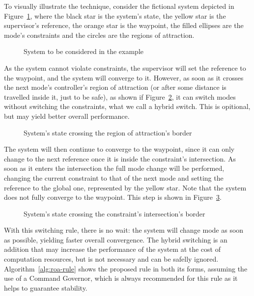 To visually illustrate the technique, consider the fictional system depicted in
Figure~\ref{fig:roa-ex1}, where the black star is the system's state, the yellow
star is the supervisor's reference, the orange star is the waypoint, the filled
ellipses are the mode's constraints and the circles are the regions of
attraction.

\begin{figure}[!htb]
  \centering
  
  \caption{System to be considered in the example}%
  \label{fig:roa-ex1}
\end{figure}

As the system cannot violate constraints, the supervisor will set the reference
to the waypoint, and the system will converge to it. However, as soon as it
crosses the next mode's controller's region of attraction (or after some
distance is travelled inside it, just to be safe), as shown if
Figure~\ref{fig:roa-ex2}, it can switch modes without switching the constraints,
what we call a hybrid switch. This is opitional, but may yield better overall
performance.

\begin{figure}[!htb]
  \centering
  
  \caption{System's state crossing the region of attraction's border}%
  \label{fig:roa-ex2}
\end{figure}

The system will then continue to converge to the waypoint, since it can only
change to the next reference once it is inside the constraint's intersection. As
soon as it enters the intersection the full mode change will be performed,
changing the current constraint to that of the next mode and setting the
reference to the global one, represented by the yellow star. Note that the
system does not fully converge to the waypoint. This step is shown in
Figure~\ref{fig:roa-ex3}.

\begin{figure}[!htb]
  \centering
  
  \caption{System's state crossing the constraint's intersection's border}%
  \label{fig:roa-ex3}
\end{figure}

With this switching rule, there is no wait: the system will change mode as soon
as possible, yielding faster overall convergence. The hybrid switching is an
addition that may increase the performance of the system at the cost of
computation resources, but is not necessary and can be safelly ignored.
Algorithm~\ref{alg:roa-rule} shows the proposed rule in both its forms, assuming
the use of a Command Governor, which is always recommended for this rule as it
helps to guarantee stability.

